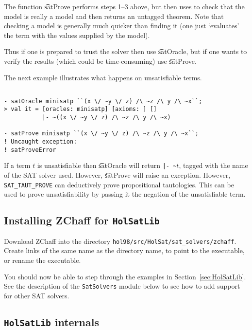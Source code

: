 The function \t{satProve}  performs steps 1--3 above, but then uses
\HOL{} to check that the model is really a model and then
returns an untagged theorem. Note that checking a model is
generally much quicker than finding it (one just `evaluates' the term
with the values supplied by the model).

Thus if one is prepared to trust the solver then use \t{satOracle},
but if one wants to verify the results (which could be time-consuming)
use \t{satProve}.


The next example illustrates what happens on unsatisfiable terms.

\begin{session}\begin{verbatim}

- satOracle minisatp ``(x \/ ~y \/ z) /\ ~z /\ y /\ ~x``;
> val it = [oracles: minisatp] [axioms: ] [] 
           |- ~((x \/ ~y \/ z) /\ ~z /\ y /\ ~x)

- satProve minisatp ``(x \/ ~y \/ z) /\ ~z /\ y /\ ~x``;
! Uncaught exception: 
! satProveError

\end{verbatim}\end{session}

If a term $t$ is unsatisfiable then \t{satOracle} will return {\small\verb+|- ~+}$t$,
tagged with the name of the SAT solver used. However, \t{satProve} will raise an exception. However, {\tt SAT\_TAUT\_PROVE} can deductively prove propositional tautologies. This can be used to prove unsatisfiability by passing it the negation of the unsatisfiable term.

\subsection{Installing ZChaff for {\tt HolSatLib}}\label{install}

Download ZChaff into the directory {\tt hol98/src/HolSat/sat\_solvers/zchaff}. Create links of the same name as the directory name, to point to the executable, or rename the executable.

You should now be able to step through the examples in Section~\ref{sec:HolSatLib}. See the description of the {\tt SatSolvers} module below to see how to add support for other SAT solvers.

\subsection{{\tt HolSatLib} internals}

